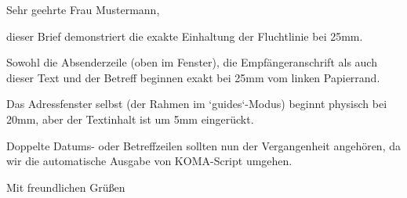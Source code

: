 \documentclass[guides]{onlinebrief24}
\begin{document}
\begin{letter}{} %

\opening{Sehr geehrte Frau Mustermann,}

dieser Brief demonstriert die exakte Einhaltung der Fluchtlinie bei 25mm. 

Sowohl die Absenderzeile (oben im Fenster), die Empfängeranschrift als auch dieser Text und der Betreff beginnen exakt bei 25mm vom linken Papierrand.

Das Adressfenster selbst (der Rahmen im `guides`-Modus) beginnt physisch bei 20mm, aber der Textinhalt ist um 5mm eingerückt.

Doppelte Datums- oder Betreffzeilen sollten nun der Vergangenheit angehören, da wir die automatische Ausgabe von KOMA-Script umgehen.

\closing{Mit freundlichen Grüßen}

\end{letter}
\end{document}
